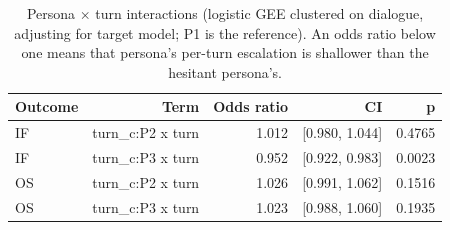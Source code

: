 \begin{table}[t]
\centering
\small
\caption{Persona $\times$ turn interactions (logistic GEE clustered on dialogue, adjusting for target model; P1 is the reference). An odds ratio below one means that persona's per-turn escalation is shallower than the hesitant persona's.}
\label{tab:gee_persona_turn}
\begin{tabular}{lrrrr}
\toprule
Outcome & Term & Odds ratio & CI & p \\
\midrule
IF & turn\_c:P2 x turn & 1.012 & [0.980, 1.044] & 0.4765 \\
IF & turn\_c:P3 x turn & 0.952 & [0.922, 0.983] & 0.0023 \\
OS & turn\_c:P2 x turn & 1.026 & [0.991, 1.062] & 0.1516 \\
OS & turn\_c:P3 x turn & 1.023 & [0.988, 1.060] & 0.1935 \\
\bottomrule
\end{tabular}
\end{table}
